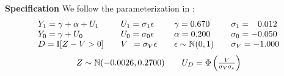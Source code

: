 \begin{frame}\textbf{Specification}\vspace{0.3cm}
	We follow the parameterization in :
	\begin{align*}\begin{array}{l@{\qquad}l@{\qquad}l@{\qquad}l}
			Y_1 = \gamma + \alpha + U_1 & U_1 = \sigma_1 \epsilon & \gamma = 0.670          & \sigma_1 = \phantom{-}0.012 \\
			Y_0 = \gamma + U_0          & U_0 = \sigma_0 \epsilon & \alpha = 0.200          & \sigma_0 = -0.050 \\
			D = \mathrm{I}[Z - V > 0]   & V\phantom{_0} = \sigma_V \epsilon   & \epsilon \sim \N(0, 1) & \sigma_V = -1.000 \\
	\end{array}\end{align*}
	\begin{align*}\begin{array}{l@{\qquad}l}
			Z \sim \N(-0.0026, 0.2700)  & U_D = \Phi\left(\frac{V}{\sigma_V\sigma_\epsilon}\right)\\
	\end{array}\end{align*}
\end{frame}

